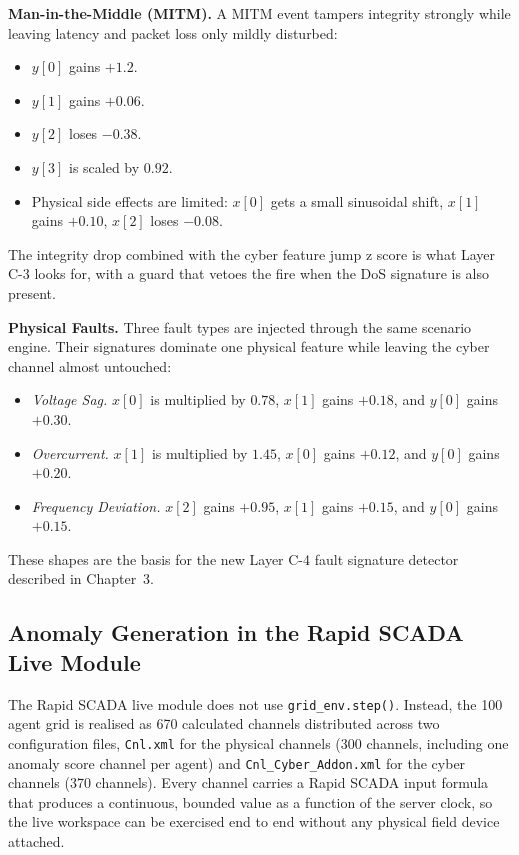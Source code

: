 \par \vspace{0.25cm}
\noindent
\textbf{Man-in-the-Middle (MITM).} A MITM event tampers integrity strongly while leaving latency and packet loss only mildly disturbed:
\begin{itemize}
    \item $y[0]$ gains $+1.2$.
    \item $y[1]$ gains $+0.06$.
    \item $y[2]$ loses $-0.38$.
    \item $y[3]$ is scaled by $0.92$.
    \item Physical side effects are limited: $x[0]$ gets a small sinusoidal shift, $x[1]$ gains $+0.10$, $x[2]$ loses $-0.08$.
\end{itemize}
The integrity drop combined with the cyber feature jump z score is what Layer C-3 looks for, with a guard that vetoes the fire when the DoS signature is also present.

\par \vspace{0.25cm}
\noindent
\textbf{Physical Faults.} Three fault types are injected through the same scenario engine. Their signatures dominate one physical feature while leaving the cyber channel almost untouched:
\begin{itemize}
    \item \textit{Voltage Sag.} $x[0]$ is multiplied by $0.78$, $x[1]$ gains $+0.18$, and $y[0]$ gains $+0.30$.
    \item \textit{Overcurrent.} $x[1]$ is multiplied by $1.45$, $x[0]$ gains $+0.12$, and $y[0]$ gains $+0.20$.
    \item \textit{Frequency Deviation.} $x[2]$ gains $+0.95$, $x[1]$ gains $+0.15$, and $y[0]$ gains $+0.15$.
\end{itemize}
These shapes are the basis for the new Layer C-4 fault signature detector described in Chapter~3.

\subsection{Anomaly Generation in the Rapid SCADA Live Module}
\label{sec:scada_anomaly}

The Rapid SCADA live module does not use \texttt{grid\_env.step()}. Instead, the 100 agent grid is realised as 670 calculated channels distributed across two configuration files, \texttt{Cnl.xml} for the physical channels (300 channels, including one anomaly score channel per agent) and \texttt{Cnl\_Cyber\_Addon.xml} for the cyber channels (370 channels). Every channel carries a Rapid SCADA input formula that produces a continuous, bounded value as a function of the server clock, so the live workspace can be exercised end to end without any physical field device attached.

